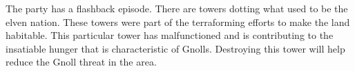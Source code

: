 The party has a flashback episode.
There are towers dotting what used to be the elven nation.
These towers were part of the terraforming efforts to make the land habitable.
This particular tower has malfunctioned and is contributing to the insatiable hunger that is characteristic of Gnolls.
Destroying this tower will help reduce the Gnoll threat in the area.

